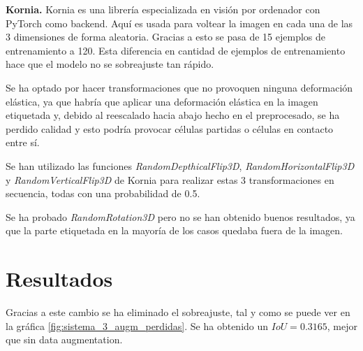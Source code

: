 \textbf{Kornia.} Kornia \cite{ERiba2020} es una librería especializada en visión por ordenador con PyTorch como backend. Aquí es usada para voltear la imagen en cada una de las 3 dimensiones de forma aleatoria. Gracias a esto se pasa de 15 ejemplos de entrenamiento a 120. Esta diferencia en cantidad de ejemplos de entrenamiento hace que el modelo no se sobreajuste tan rápido.

Se ha optado por hacer transformaciones que no provoquen ninguna deformación elástica, ya que habría que aplicar una deformación elástica en la imagen etiquetada y, debido al reescalado hacia abajo hecho en el preprocesado, se ha perdido calidad y esto podría provocar células partidas o células en contacto entre sí.

Se han utilizado las funciones \textit{RandomDepthicalFlip3D}, \textit{RandomHorizontalFlip3D} y \textit{RandomVerticalFlip3D} de Kornia para realizar estas 3 transformaciones en secuencia, todas con una probabilidad de 0.5.

Se ha probado \textit{RandomRotation3D} pero no se han obtenido buenos resultados, ya que la parte etiquetada en la mayoría de los casos quedaba fuera de la imagen.

\section{Resultados}\label{sec:data_augmentation_resultados}




Gracias a este cambio se ha eliminado el sobreajuste, tal y como se puede ver en la gráfica \ref{fig:sistema_3_augm_perdidas}. Se ha obtenido un $IoU=0.3165$, mejor que sin data augmentation.